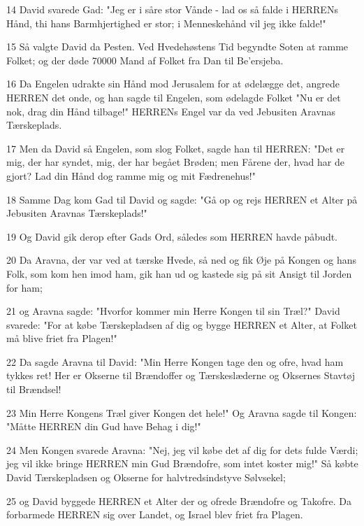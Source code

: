 \par 14 David svarede Gad: "Jeg er i såre stor Vånde - lad os så falde i HERRENs Hånd, thi hans Barmhjertighed er stor; i Menneskehånd vil jeg ikke falde!"
\par 15 Så valgte David da Pesten. Ved Hvedehøstens Tid begyndte Soten at ramme Folket; og der døde 70000 Mand af Folket fra Dan til Be'ersjeba.
\par 16 Da Engelen udrakte sin Hånd mod Jerusalem for at ødelægge det, angrede HERREN det onde, og han sagde til Engelen, som ødelagde Folket "Nu er det nok, drag din Hånd tilbage!" HERRENs Engel var da ved Jebusiten Aravnas Tærskeplads.
\par 17 Men da David så Engelen, som slog Folket, sagde han til HERREN: "Det er mig, der har syndet, mig, der har begået Brøden; men Fårene der, hvad har de gjort? Lad din Hånd dog ramme mig og mit Fædrenehus!"
\par 18 Samme Dag kom Gad til David og sagde: "Gå op og rejs HERREN et Alter på Jebusiten Aravnas Tærskeplads!"
\par 19 Og David gik derop efter Gads Ord, således som HERREN havde påbudt.
\par 20 Da Aravna, der var ved at tærske Hvede, så ned og fik Øje på Kongen og hans Folk, som kom hen imod ham, gik han ud og kastede sig på sit Ansigt til Jorden for ham;
\par 21 og Aravna sagde: "Hvorfor kommer min Herre Kongen til sin Træl?" David svarede: "For at købe Tærskepladsen af dig og bygge HERREN et Alter, at Folket må blive friet fra Plagen!"
\par 22 Da sagde Aravna til David: "Min Herre Kongen tage den og ofre, hvad ham tykkes ret! Her er Okserne til Brændoffer og Tærskeslæderne og Oksernes Stavtøj til Brændsel!
\par 23 Min Herre Kongens Træl giver Kongen det hele!" Og Aravna sagde til Kongen: "Måtte HERREN din Gud have Behag i dig!"
\par 24 Men Kongen svarede Aravna: "Nej, jeg vil købe det af dig for dets fulde Værdi; jeg vil ikke bringe HERREN min Gud Brændofre, som intet koster mig!" Så købte David Tærskepladsen og Okserne for halvtredsindstyve Sølvsekel;
\par 25 og David byggede HERREN et Alter der og ofrede Brændofre og Takofre. Da forbarmede HERREN sig over Landet, og Israel blev friet fra Plagen.



